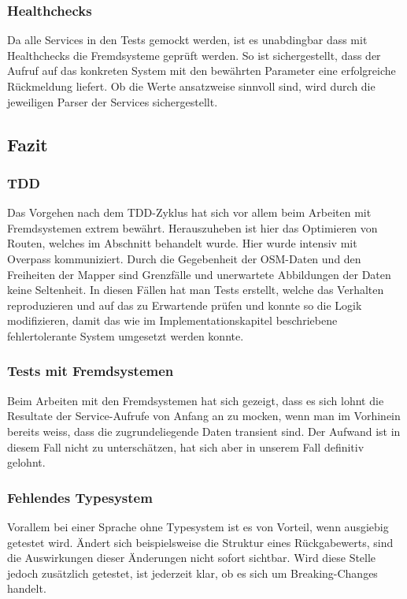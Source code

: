 \subsubsection{Healthchecks}
\label{test:Healthchecks}
Da alle Services in den Tests gemockt werden, ist es unabdingbar dass mit Healthchecks die Fremdsysteme geprüft werden. So ist sichergestellt, dass der Aufruf auf das konkreten System mit den bewährten Parameter eine erfolgreiche Rückmeldung liefert. Ob die Werte ansatzweise sinnvoll sind, wird durch die jeweiligen Parser der Services sichergestellt.

\subsection{Fazit}
\label{test:Fazit}

\subsubsection{TDD}
\label{fazit:TDD}
Das Vorgehen nach dem \ac{TDD}-Zyklus hat sich vor allem beim Arbeiten mit Fremdsystemen extrem bewährt. Herauszuheben ist hier das Optimieren von Routen, welches im Abschnitt  behandelt wurde. Hier wurde intensiv mit Overpass \cite{wiki:overpass} kommuniziert. Durch die Gegebenheit der \ac{OSM}-Daten und den Freiheiten der Mapper sind Grenzfälle und unerwartete Abbildungen der Daten keine Seltenheit. In diesen Fällen hat man Tests erstellt, welche das Verhalten reproduzieren und auf das zu Erwartende prüfen und konnte so die Logik modifizieren, damit das wie im Implementationskapitel beschriebene fehlertolerante System umgesetzt werden konnte.

\subsubsection{Tests mit Fremdsystemen}
\label{fazit:Tests mit Fremdsystemen}
Beim Arbeiten mit den Fremdsystemen hat sich gezeigt, dass es sich lohnt die Resultate der Service-Aufrufe von Anfang an zu mocken, wenn man im Vorhinein bereits weiss, dass die zugrundeliegende Daten transient sind. Der Aufwand ist in diesem Fall nicht zu unterschätzen, hat sich aber in unserem Fall definitiv gelohnt.

\subsubsection{Fehlendes Typesystem}
\label{fazit:Fehlendes Typesystem}
Vorallem bei einer Sprache ohne Typesystem ist es von Vorteil, wenn ausgiebig getestet wird. Ändert sich beispielsweise die Struktur eines Rückgabewerts, sind die Auswirkungen dieser Änderungen nicht sofort sichtbar. Wird diese Stelle jedoch zusätzlich getestet, ist jederzeit klar, ob es sich um Breaking-Changes handelt.
